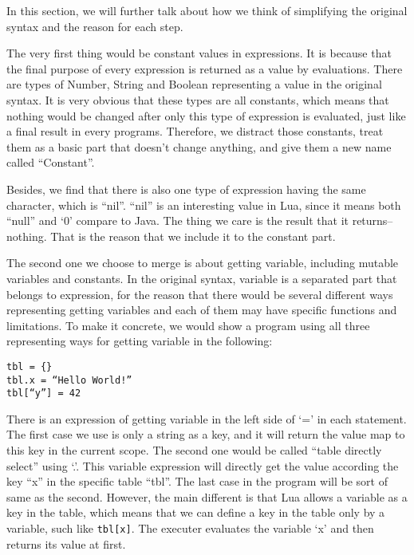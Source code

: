 In this section, we will further talk about how we think of simplifying the original syntax and the reason for each step.

The very first thing would be constant values in expressions. It is because that the final purpose of every expression is returned as a value by evaluations. There are types of Number, String and Boolean representing a value in the original syntax. It is very obvious that these types are all constants, which means that nothing would be changed after only this type of expression is evaluated, just like a final result in every programs. Therefore, we distract those constants, treat them as a basic part that doesn’t change anything, and give them a new name called ``Constant''.

Besides, we find that there is also one type of expression having the same character, which is ``nil''. ``nil'' is an interesting value in Lua, since it means both ``null'' and `0' compare to Java. The thing we care is the result that it returns--nothing. That is the reason that we include it to the constant part.

The second one we choose to merge is about getting variable, including mutable variables and constants. In the original syntax, variable is a separated part that belongs to expression, for the reason that there would be several different ways representing getting variables and each of them may have specific functions and limitations. To make it concrete, we would show a program using all three representing ways for getting variable in the following:
\begin{flushleft}
\tt tbl = \{\}\\
\tt tbl.x = ``Hello World!''\\
\tt tbl[``y''] = 42\\
\end{flushleft}

There is an expression of getting variable in the left side of `=' in each statement. The first case we use is only a string as a key, and it will return the value map to this key in the current scope. The second one would be called ``table directly select'' using `.'. This variable expression will directly get the value according the key ``x'' in the specific table ``tbl''. The last case in the program will be sort of same as the second. However, the main different is that Lua allows a variable as a key in the table, which means that we can define a key in the table only by a variable, such like {\tt tbl[x]}. The executer evaluates the variable `x’ and then returns its value at first.

